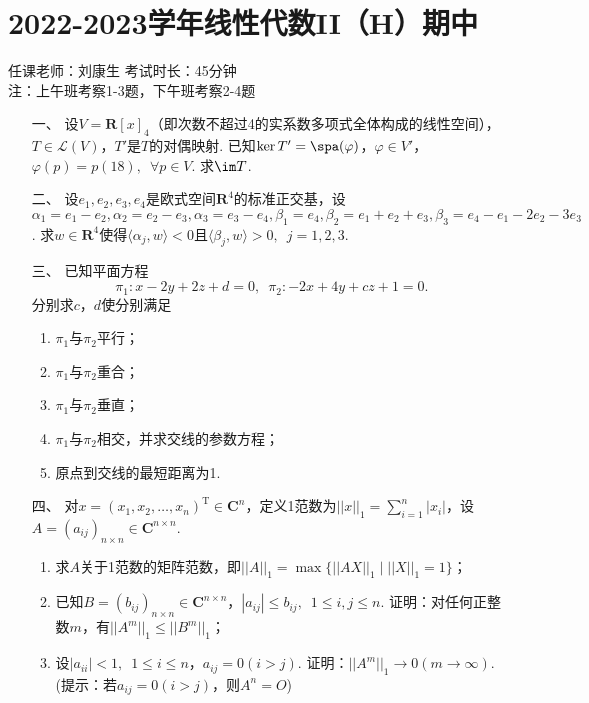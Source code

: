 \section*{2022-2023学年线性代数II（H）期中}

\begin{center}
    任课老师：刘康生\hspace{4em} 考试时长：45分钟 \\
    注：上午班考察1-3题，下午班考察2-4题
\end{center}

\begin{enumerate}
	\item[一、]设$V=\mathbf{R}[x]_4$（即次数不超过4的实系数多项式全体构成的线性空间），$T\in\mathcal{L}(V)$，$T'$是$T$的对偶映射. 已知$\ker T'=\spa(\varphi)$，$\varphi\in V'$，$\varphi(p)=p(18),\enspace\forall p\in V$. 求$\im T$.
	\item[二、]设$e_1,e_2,e_3,e_4$是欧式空间$\mathbf{R}^4$的标准正交基，设$\alpha_1=e_1-e_2,\alpha_2=e_2-e_3,\alpha_3=e_3-e_4,\beta_1=e_4,\beta_2=e_1+e_2+e_3,\beta_3=e_4-e_1-2e_2-3e_3$. 求$w\in\mathbf{R}^4$使得$\langle\alpha_j,w\rangle<0$且$\langle\beta_j,w\rangle>0,\enspace j=1,2,3$.
	\item[三、]已知平面方程
    \[\pi_1:x-2y+2z+d=0,\enspace \pi_2:-2x+4y+cz+1=0.\]
    分别求$c$，$d$使分别满足
    \begin{enumerate}[label=(\arabic*)]
        \item $\pi_1$与$\pi_2$平行；

        \item $\pi_1$与$\pi_2$重合；

        \item $\pi_1$与$\pi_2$垂直；

        \item $\pi_1$与$\pi_2$相交，并求交线的参数方程；

        \item 原点到交线的最短距离为1.
    \end{enumerate}
	\item[四、]对$x=(x_1,x_2,\ldots,x_n)^\mathrm{T}\in\mathbf{C}^n$，定义1范数为$||x||_1=\sum\limits_{i=1}^n|x_i|$，设$A=(a_{ij})_{n\times n}\in\mathbf{C}^{n\times n}$.
	\begin{enumerate}[label=(\arabic*)]
        \item 求$A$关于1范数的矩阵范数，即$||A||_1=\max\{||AX||_1\mid ||X||_1=1\}$；

        \item 已知$B=(b_{ij})_{n\times n}\in\mathbf{C}^{n\times n}$，$|a_{ij}|\leqslant b_{ij},\enspace 1\leqslant i,j\leqslant n$. 证明：对任何正整数$m$，有$||A^m||_1\leqslant||B^m||_1$；

        \item 设$|a_{ii}|<1,\enspace 1\leqslant i\leqslant n$，$a_{ij}=0(i>j)$. 证明：$||A^m||_1\to 0(m\to\infty)$.(提示：若$a_{ij}=0(i>j)$，则$A^n=O$)
    \end{enumerate}
\end{enumerate}

\clearpage

